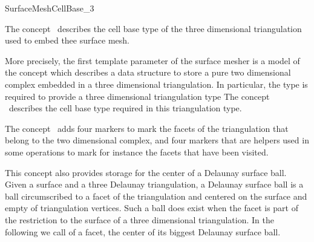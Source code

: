

\begin{ccRefConcept}{SurfaceMeshCellBase_3}


\ccDefinition
The concept \ccRefName\ describes the cell base type
of the three dimensional triangulation used
to embed thee surface mesh.  

More precisely,
the first template parameter  of the surface mesher
is a model of the concept 
which describes a data structure to store
a pure two dimensional complex 
embedded in a three dimensional triangulation.
In particular, the type  is required to provide
a three dimensional triangulation type
The concept \ccRefName\ describes the cell base type
required in this triangulation type.

\ccGeneralizes
{}

The concept \ccRefName\ adds four markers to mark the facets
of the triangulation that belong to the two dimensional complex,
and four markers  that are helpers 
used in some operations to mark for instance
the facets that have been visited.

This concept also provides storage for  the center of a Delaunay surface
ball. 
Given a surface and a three Delaunay triangulation,
 a Delaunay surface ball
is a ball circumscribed to a facet of the triangulation
and centered on the surface and empty of triangulation vertices. 
Such a ball does exist
when the facet is part of the restriction to the surface
of a three dimensional triangulation.
 In the following we call 
of a facet, the center of its biggest Delaunay surface ball.

\ccTypes



\end{ccRefConcept}
